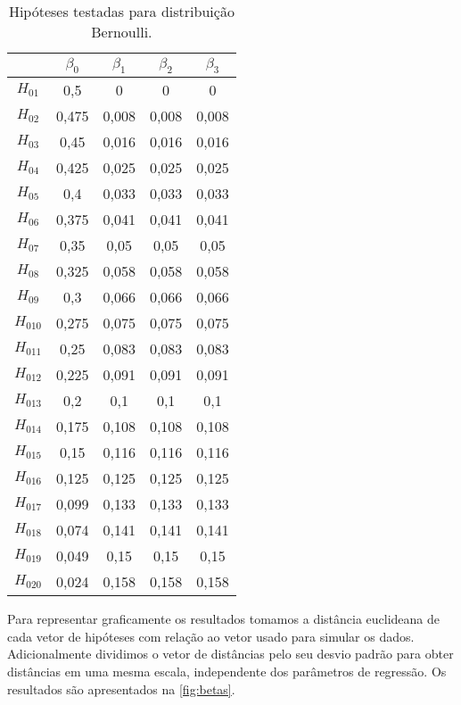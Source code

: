 \begin{table}[H]
\centering
\begin{tabular}{ccccc}
\hline
          & $\beta_0$ & $\beta_1$ & $\beta_2$ & $\beta_3$ \\ \hline
$H_{01}$  & 0,5       & 0         & 0         & 0         \\
$H_{02}$  & 0,475     & 0,008     & 0,008     & 0,008     \\
$H_{03}$  & 0,45      & 0,016     & 0,016     & 0,016     \\
$H_{04}$  & 0,425     & 0,025     & 0,025     & 0,025     \\
$H_{05}$  & 0,4       & 0,033     & 0,033     & 0,033     \\
$H_{06}$  & 0,375     & 0,041     & 0,041     & 0,041     \\
$H_{07}$  & 0,35      & 0,05      & 0,05      & 0,05      \\
$H_{08}$  & 0,325     & 0,058     & 0,058     & 0,058     \\
$H_{09}$  & 0,3       & 0,066     & 0,066     & 0,066     \\
$H_{010}$ & 0,275     & 0,075     & 0,075     & 0,075     \\
$H_{011}$ & 0,25      & 0,083     & 0,083     & 0,083     \\
$H_{012}$ & 0,225     & 0,091     & 0,091     & 0,091     \\
$H_{013}$ & 0,2       & 0,1       & 0,1       & 0,1       \\
$H_{014}$ & 0,175     & 0,108     & 0,108     & 0,108     \\
$H_{015}$ & 0,15      & 0,116     & 0,116     & 0,116     \\
$H_{016}$ & 0,125     & 0,125     & 0,125     & 0,125     \\
$H_{017}$ & 0,099     & 0,133     & 0,133     & 0,133     \\
$H_{018}$ & 0,074     & 0,141     & 0,141     & 0,141     \\
$H_{019}$ & 0,049     & 0,15      & 0,15      & 0,15      \\
$H_{020}$ & 0,024     & 0,158     & 0,158     & 0,158     \\ \hline
\end{tabular}
\caption{Hipóteses testadas para distribuição Bernoulli.}
\label{tab:th_bernoulli}
\end{table}

Para representar graficamente os resultados tomamos a distância euclideana de cada vetor de hipóteses com relação ao vetor usado para simular os dados. Adicionalmente dividimos o vetor de distâncias pelo seu desvio padrão para obter distâncias em uma mesma escala, independente dos parâmetros de regressão. Os resultados são apresentados na \autoref{fig:betas}.

